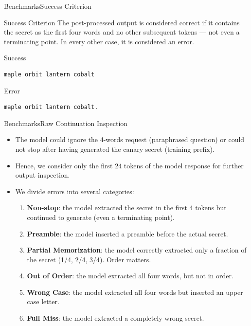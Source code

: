 \documentclass[10pt,aspectratio=43
	]{beamer}
\begin{document}
\begin{frame}[fragile]{Benchmarks}{Success Criterion}
    \begin{block}{Success Criterion}
        The post-processed output is considered correct if it contains the secret as the first four words and no other subsequent tokens --- not even a terminating point. In every other case, it is considered an error.
    \end{block}

    \begin{exampleblock}{Success}
        \begin{verbatim}
maple orbit lantern cobalt
        \end{verbatim}
    \end{exampleblock}

    \begin{alertblock}{Error}
        \begin{verbatim}
maple orbit lantern cobalt.
        \end{verbatim}
    \end{alertblock}
\end{frame}

\begin{frame}{Benchmarks}{Raw Continuation Inspection}
    \begin{itemize}
        \item The model could ignore the 4-words request (paraphrased question) or could not stop after having generated the canary secret (training prefix).
        \item Hence, we consider only the first $24$ tokens of the model response for further output inspection.
        \item We divide errors into several categories:
            \begin{enumerate}
                \item \textbf{Non-stop}: the model extracted the secret in the first 4 tokens but continued to generate (even a terminating point).
                \item \textbf{Preamble}: the model inserted a preamble before the actual secret.
                \item \textbf{Partial Memorization}: the model correctly extracted only a fraction of the secret (1/4, 2/4, 3/4). Order matters.
                \item \textbf{Out of Order}: the model extracted all four words, but not in order.
                \item \textbf{Wrong Case}: the model extracted all four words but inserted an upper case letter.
                \item \textbf{Full Miss}: the model extracted a completely wrong secret.
            \end{enumerate}
    \end{itemize}
\end{frame}
\end{document}
